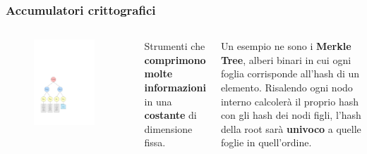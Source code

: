 \documentclass{beamer}
\begin{document}
\begin{frame}
	\frametitle{Accumulatori crittografici}
	\begin{columns}
		\begin{figure}
			\includegraphics[width=0.9\textwidth]{figures/mt1.pdf}
		\end{figure}
		Strumenti che \textbf{comprimono molte informazioni}
		in una \textbf{costante} di dimensione fissa.
		
		Un esempio ne sono i \textbf{Merkle Tree}, alberi binari
		in cui ogni foglia corrisponde all'hash di un elemento.
		Risalendo ogni nodo interno calcolerà il proprio hash
		con gli hash dei nodi figli, l'hash della root
		sarà \textbf{univoco} a quelle foglie in quell'ordine.
	\end{columns}
\end{frame}
\end{document}
